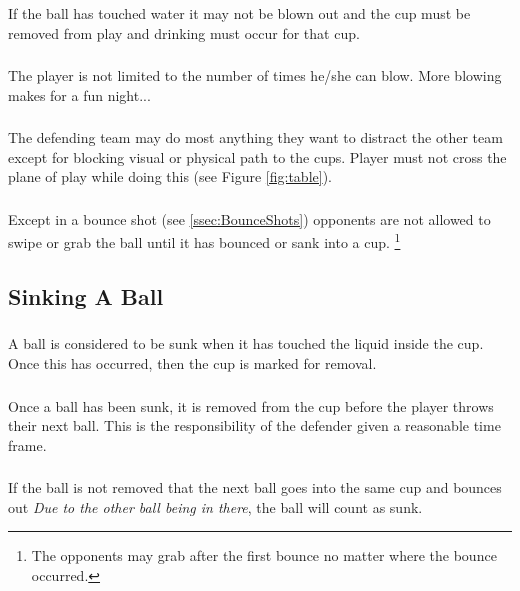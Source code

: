 		\subsubsection{}\label{ssec:Defending,blowing_voids}
			If the ball has touched water it may not be blown out and the cup must be removed from play and drinking must occur for that cup.
		\subsubsection{}\label{sssec:Defending,blowing_times}
			The player is not limited to the number of times he/she can blow. More blowing makes for a fun night...
		\subsubsection{}\label{sssec:Defending,pysycedout}
			The defending team may do most anything they want to distract the other team except for blocking visual or physical path to the cups.
            Player must not cross the plane of play while doing this (see Figure \ref{fig:table}).
		\subsubsection{}\label{sssec:Defending,balltouching}
			Except in a bounce shot (see \ref{ssec:BounceShots}) opponents are not allowed to swipe or grab the ball until it has bounced or sank into a cup.
            \footnote{The opponents may grab after the first bounce no matter where the bounce occurred.}
		
	\subsection{Sinking A Ball}\label{ssec:Sinking}
		\subsubsection{}\label{sssec:Sinking,def}
			A ball is considered to be sunk when it has touched the liquid inside the cup.
            Once this has occurred, then the cup is marked for removal. 
		\subsubsection{}\label{sssec:Sinking,removal}
			Once a ball has been sunk, it is removed from the cup before the player throws their next ball.
            This is the responsibility of the defender given a reasonable time frame.
		\subsubsection{}\label{sssec:Sinking,non-removal}
			If the ball is not removed that the next ball goes into the same cup and bounces out \textit{Due to the other ball being in there}, the ball will count as sunk.
